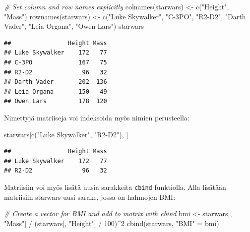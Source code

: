 \documentclass[
]{book}
\newenvironment{Shaded}{\begin{snugshade}}{\end{snugshade}}
\newcommand{\CommentTok}[1]{\textcolor[rgb]{0.56,0.35,0.01}{\textit{#1}}}
\newcommand{\DecValTok}[1]{\textcolor[rgb]{0.00,0.00,0.81}{#1}}
\newcommand{\FunctionTok}[1]{\textcolor[rgb]{0.00,0.00,0.00}{#1}}
\newcommand{\NormalTok}[1]{#1}
\newcommand{\OtherTok}[1]{\textcolor[rgb]{0.56,0.35,0.01}{#1}}
\newcommand{\SpecialCharTok}[1]{\textcolor[rgb]{0.00,0.00,0.00}{#1}}
\newcommand{\StringTok}[1]{\textcolor[rgb]{0.31,0.60,0.02}{#1}}
\begin{document}
\begin{Shaded}
\begin{Highlighting}[]
\CommentTok{\# Set column and row names explicitly}
\FunctionTok{colnames}\NormalTok{(starwars) }\OtherTok{\textless{}{-}} \FunctionTok{c}\NormalTok{(}\StringTok{"Height"}\NormalTok{, }\StringTok{"Mass"}\NormalTok{)}
\FunctionTok{rownames}\NormalTok{(starwars) }\OtherTok{\textless{}{-}} \FunctionTok{c}\NormalTok{(}\StringTok{"Luke Skywalker"}\NormalTok{, }\StringTok{"C{-}3PO"}\NormalTok{, }\StringTok{"R2{-}D2"}\NormalTok{, }\StringTok{"Darth Vader"}\NormalTok{, }\StringTok{"Leia Organa"}\NormalTok{, }\StringTok{"Owen Lars"}\NormalTok{)}
\NormalTok{starwars}
\end{Highlighting}
\end{Shaded}

\begin{verbatim}
##                Height Mass
## Luke Skywalker    172   77
## C-3PO             167   75
## R2-D2              96   32
## Darth Vader       202  136
## Leia Organa       150   49
## Owen Lars         178  120
\end{verbatim}

Nimettyjä matriiseja voi indeksoida myös nimien perusteella:

\begin{Shaded}
\begin{Highlighting}[]
\NormalTok{starwars[}\FunctionTok{c}\NormalTok{(}\StringTok{"Luke Skywalker"}\NormalTok{, }\StringTok{"R2{-}D2"}\NormalTok{), ]}
\end{Highlighting}
\end{Shaded}

\begin{verbatim}
##                Height Mass
## Luke Skywalker    172   77
## R2-D2              96   32
\end{verbatim}

Matriisiin voi myös lisätä uusia sarakkeita \texttt{cbind} funktiolla. Alla lisätään matriisiin starwars uusi sarake, jossa on hahmojen BMI:

\begin{Shaded}
\begin{Highlighting}[]
\CommentTok{\# Create a vector for BMI and add to matrix with cbind}
\NormalTok{bmi }\OtherTok{\textless{}{-}}\NormalTok{ starwars[, }\StringTok{"Mass"}\NormalTok{] }\SpecialCharTok{/}\NormalTok{ (starwars[, }\StringTok{"Height"}\NormalTok{] }\SpecialCharTok{/} \DecValTok{100}\NormalTok{)}\SpecialCharTok{\^{}}\DecValTok{2}
\FunctionTok{cbind}\NormalTok{(starwars, }\StringTok{"BMI"} \OtherTok{=}\NormalTok{ bmi)}
\end{Highlighting}
\end{Shaded}
\end{document}
